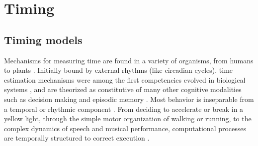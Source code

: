 \chapter{Timing}
\section{Timing models}
\label{sub:models}



Mechanisms for measuring time are found in a variety of organisms, from humans to plants \cite{cashmore2003cryptochromes}. Initially bound by external rhythms (like circadian cycles), time estimation mechanisms were among the first competencies evolved in biological systems \cite{paranjpe2005evolution}, and are theorized as constitutive of many other cognitive modalities such as decision making and episodic memory \cite{maniadakis2014time}. Most behavior is inseparable from a temporal or rhythmic component \cite{buhusi2005makes}. From deciding to accelerate or break in a yellow light, through the simple motor organization of walking or running, to the complex dynamics of speech and musical performance, computational processes are temporally structured to correct execution \cite{bueti2014temporal}. %


